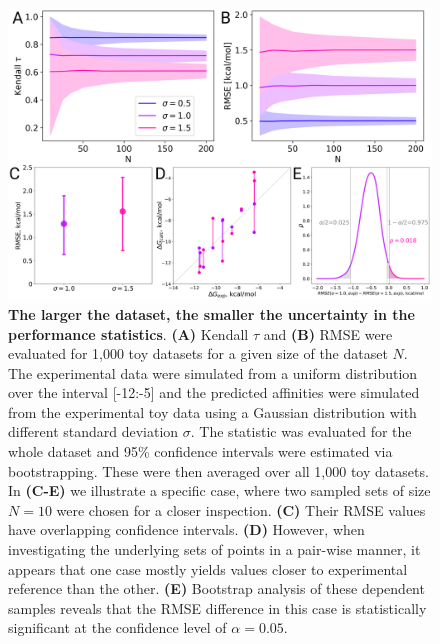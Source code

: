 \documentclass[9pt,bestpractices,pubversion]{livecoms}
\begin{document}
\begin{figure}[!ht]
    \centering
    \includegraphics[width=0.95\linewidth]{figures/fig8_updated.png}
    \caption{\textbf{The larger the dataset, the smaller the uncertainty in the performance statistics}. \textbf{(A)} Kendall $\tau$ and \textbf{(B)} RMSE were evaluated for 1,000 toy datasets for a given size of the dataset $N$. The experimental data were simulated from a uniform distribution over the interval [-12:-5] and the predicted affinities were simulated from the experimental toy data using a Gaussian distribution with different standard deviation $\sigma$. The statistic was evaluated for the whole dataset and 95\% confidence intervals were estimated via bootstrapping. These were then averaged over all 1,000 toy datasets. In \textbf{(C-E)} we illustrate a specific case, where two sampled sets of size $N=10$ were chosen for a closer inspection. \textbf{(C)} Their RMSE values have overlapping confidence intervals. \textbf{(D)} However, when investigating the underlying sets of points in a pair-wise manner, it appears that one case mostly yields values closer to experimental reference than the other. \textbf{(E)} Bootstrap analysis of these dependent samples reveals that the RMSE difference in this case is statistically significant at the confidence level of $\alpha=0.05$.}
    \label{fig:N_CI}
\end{figure}
\end{document}
